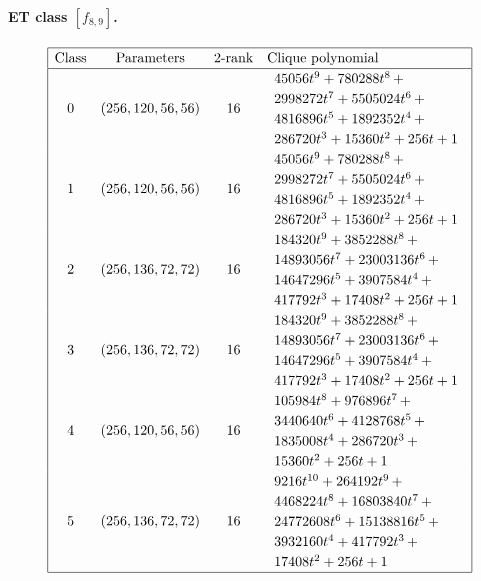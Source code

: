\documentclass[12pt,a4paper]{article}
\begin{document}
\paragraph*{ET class $[f_{8,9}]$.}
\small{}
\begin{align*}
\def\arraystretch{1.2}
\begin{array}{|cccl|}
\hline
\text{Class} &
\text{Parameters} &
\text{2-rank} &
\text{Clique polynomial}
\\
\hline
0 &
(256, 120, 56, 56) &
16 &
\begin{array}{l}
45056t^{9} + 780288t^{8}
\,+
\\
 2998272t^{7} + 5505024t^{6}
\,+
\\
 4816896t^{5} + 1892352t^{4}
\,+
\\
 286720t^{3} + 15360t^{2} + 256t + 1
\end{array}
\\
1 &
(256, 120, 56, 56) &
16 &
\begin{array}{l}
45056t^{9} + 780288t^{8}
\,+
\\
 2998272t^{7} + 5505024t^{6}
\,+
\\
 4816896t^{5} + 1892352t^{4}
\,+
\\
 286720t^{3} + 15360t^{2} + 256t + 1
\end{array}
\\
2 &
(256, 136, 72, 72) &
16 &
\begin{array}{l}
184320t^{9} + 3852288t^{8}
\,+
\\
 14893056t^{7} + 23003136t^{6}
\,+
\\
 14647296t^{5} + 3907584t^{4}
\,+
\\
 417792t^{3} + 17408t^{2} + 256t + 1
\end{array}
\\
3 &
(256, 136, 72, 72) &
16 &
\begin{array}{l}
184320t^{9} + 3852288t^{8}
\,+
\\
 14893056t^{7} + 23003136t^{6}
\,+
\\
 14647296t^{5} + 3907584t^{4}
\,+
\\
 417792t^{3} + 17408t^{2} + 256t + 1
\end{array}
\\
4 &
(256, 120, 56, 56) &
16 &
\begin{array}{l}
105984t^{8} + 976896t^{7}
\,+
\\
 3440640t^{6} + 4128768t^{5}
\,+
\\
 1835008t^{4} + 286720t^{3}
\,+
\\
 15360t^{2} + 256t + 1
\end{array}
\\
5 &
(256, 136, 72, 72) &
16 &
\begin{array}{l}
9216t^{10} + 264192t^{9}
\,+
\\
 4468224t^{8} + 16803840t^{7}
\,+
\\
 24772608t^{6} + 15138816t^{5}
\,+
\\
 3932160t^{4} + 417792t^{3}
\,+
\\
 17408t^{2} + 256t + 1
\end{array}
\\
\hline
\end{array}
\end{align*}
\end{document}
